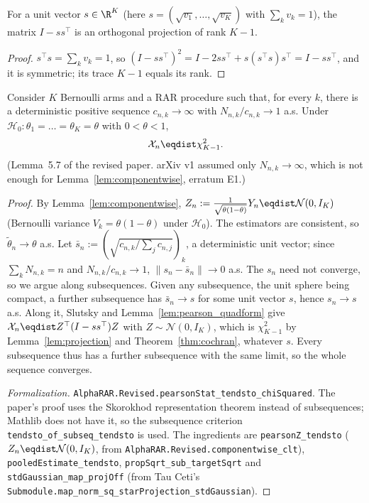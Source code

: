 \begin{lemma}\label{lem:projection}
\leanok
For a unit vector $s\in\R^K$ (here $s=(\sqrt{v_1},\dots,\sqrt{v_K})$ with
$\sum_k v_k=1$), the matrix $I - s s^\top$ is an orthogonal projection of rank
$K-1$.
\end{lemma}

\begin{proof}\leanok
$s^\top s = \sum_k v_k = 1$, so $(I-ss^\top)^2 = I - 2ss^\top + s(s^\top s)s^\top
 = I - ss^\top$, and it is symmetric; its trace $K-1$ equals its rank.
\end{proof}

\begin{lemma}\label{lem:pearson}
\leanok
{}
Consider $K$ Bernoulli arms and a RAR procedure such that, for every $k$, there is a deterministic
positive sequence $c_{n,k}\to\infty$ with $N_{n,k}/c_{n,k}\to1$ a.s. Under
$\mathcal{H}_0:\theta_1=\dots=\theta_K=\theta$ with $0<\theta<1$,
\[
  \mathcal{X}_n \eqdist \chi^2_{K-1}.
\]
(Lemma~5.7 of the revised paper. arXiv v1 assumed only $N_{n,k}\to\infty$, which is not enough for
Lemma~\ref{lem:componentwise}, erratum E1.)
\end{lemma}

\begin{proof}\leanok
{}
By Lemma~\ref{lem:componentwise}, $Z_n:=\frac{1}{\sqrt{\theta(1-\theta)}}Y_n
\eqdist\mathcal{N}(0,I_K)$ (Bernoulli variance $V_k=\theta(1-\theta)$ under
$\mathcal{H}_0$). The estimators are consistent, so $\tilde{\theta}_n\to\theta$ a.s. Let
$\bar s_n:=(\sqrt{c_{n,k}/\sum_jc_{n,j}})_k$, a deterministic unit vector; since
$\sum_kN_{n,k}=n$ and $N_{n,k}/c_{n,k}\to1$, $\|s_n-\bar s_n\|\to0$ a.s. The $s_n$ need not
converge, so we argue along subsequences. Given any subsequence, the unit sphere being compact, a
further subsequence has $\bar s_n\to s$ for some unit vector $s$, hence $s_n\to s$ a.s. Along it,
Slutsky and Lemma~\ref{lem:pearson_quadform} give $\mathcal{X}_n\eqdist Z^\top(I-ss^\top)Z$ with
$Z\sim\mathcal{N}(0,I_K)$, which is $\chi^2_{K-1}$ by Lemma~\ref{lem:projection} and
Theorem~\ref{thm:cochran}, whatever $s$. Every subsequence thus has a further subsequence with the
same limit, so the whole sequence converges.

\emph{Formalization.} \texttt{AlphaRAR.Revised.pearsonStat\_tendsto\_chiSquared}. The paper's proof
uses the Skorokhod representation theorem instead of subsequences; Mathlib does not have it, so the
subsequence criterion \texttt{tendsto\_of\_subseq\_tendsto} is used. The ingredients are
\texttt{pearsonZ\_tendsto} ($Z_n\eqdist\mathcal N(0,I_K)$, from
\texttt{AlphaRAR.Revised.componentwise\_clt}), \texttt{pooledEstimate\_tendsto},
\texttt{propSqrt\_sub\_targetSqrt} and \texttt{stdGaussian\_map\_projOff} (from Tau Ceti's
\texttt{Submodule.map\_norm\_sq\_starProjection\_stdGaussian}).
\end{proof}

